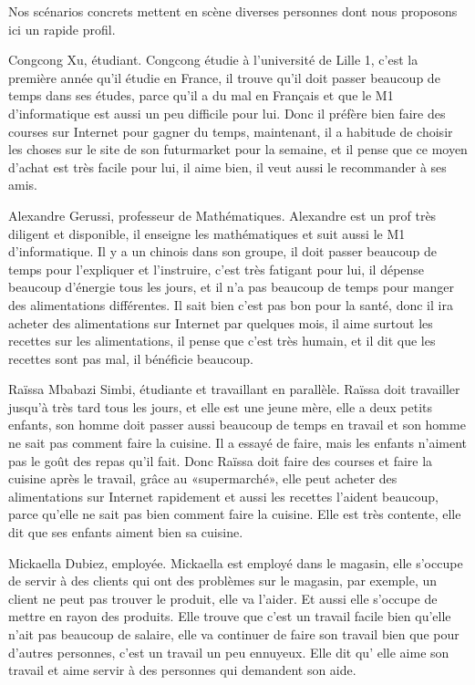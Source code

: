 Nos scénarios concrets mettent en scène diverses personnes dont nous proposons ici un rapide profil.
\blank[big]

Congcong Xu, étudiant.\crlf
Congcong étudie à l'université de Lille 1, c'est la première année qu'il étudie en France, il trouve qu'il doit passer beaucoup de temps dans ses études, parce qu'il a du mal en Français et que le M1 d'informatique est aussi un peu difficile pour lui. 
Donc il préfère bien faire des courses sur Internet pour gagner du temps, maintenant, il a habitude de choisir les choses sur le site de son futurmarket pour la semaine, et il pense que ce moyen d'achat est très facile pour lui, il aime bien, il veut aussi le recommander à ses amis.
\stopfiguretext

Alexandre Gerussi, professeur de Mathématiques.\crlf
Alexandre est un prof très diligent et disponible, il enseigne les mathématiques et suit aussi le M1 d'informatique. 
Il y a un chinois dans son groupe, il doit passer beaucoup de temps pour l'expliquer et l'instruire, c'est très fatigant pour lui, il dépense beaucoup d'énergie tous les jours, et il n'a pas beaucoup de temps pour manger des alimentations différentes. 
Il sait bien c'est pas bon pour la santé, donc il ira acheter des alimentations sur Internet par quelques mois, il aime surtout les recettes sur les alimentations, il pense que c'est très humain, et il dit que les recettes sont pas mal, il bénéficie beaucoup.
\stopfiguretext

Raïssa Mbabazi Simbi, étudiante et travaillant en parallèle.\crlf
Raïssa doit travailler jusqu'à très tard tous les jours, et elle est une jeune mère, elle a deux petits enfants, son homme doit passer aussi beaucoup de temps en travail et son homme ne sait pas comment faire la cuisine. 
Il a essayé de faire, mais les enfants n'aiment pas le goût des repas qu'il fait. 
Donc Raïssa doit faire des courses et faire la cuisine après le travail, grâce au «supermarché», elle peut acheter des alimentations sur Internet rapidement et aussi les recettes l'aident beaucoup, parce qu'elle ne sait pas bien comment faire la cuisine. 
Elle est très contente, elle dit que ses enfants aiment bien sa cuisine.
\stopfiguretext

Mickaella Dubiez, employée.\crlf
Mickaella est employé dans le magasin, elle s'occupe de servir à des clients qui ont des problèmes sur le magasin, par exemple, un client ne peut pas trouver le produit, elle va l'aider. 
Et aussi elle s'occupe de mettre en rayon des produits. 
Elle trouve que c'est un travail facile bien qu'elle n'ait pas beaucoup de salaire, elle va continuer de faire son travail bien que pour d'autres personnes, c'est un travail un peu ennuyeux. 
Elle dit qu' elle aime son travail et aime servir à des personnes qui demandent son aide.
\stopfiguretext

